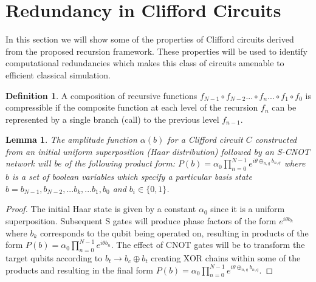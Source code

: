 \documentclass[reqno]{amsart}
\newtheorem{lem}[thm]{Lemma}
\theoremstyle{definition}
\newtheorem{definition}[thm]{Definition}
\theoremstyle{remark}
\begin{document}
\section{Redundancy in Clifford Circuits}
\noindent
In this section we will show some of the properties of Clifford circuits derived from the proposed recursion framework. These properties will be used to identify computational redundancies which makes this class of circuits amenable to efficient classical simulation.
\newline

\begin{definition}
A composition of recursive functions $f_{N-1} \circ f_{N-2} ... \circ f_n ... \circ f_1 \circ f_0$ is compressible if the composite function at each level of the recursion $f_n$ can be represented by a single branch (call) to the previous level $f_{n-1} $.

\end{definition}

\begin{lem}
The amplitude function $\alpha(b)$ for a Clifford circuit $C$ constructed from an initial uniform superposition (Haar distribution) followed by an S-CNOT network will be of the following product form: $P(b) = \alpha_0 \prod_{n=0}^{N-1} {e^{i \theta \oplus_{n,q} b_{n,q}} }$ where $b$ is a set of boolean variables which specify a particular basis state $b = b_{N-1}, b_{N-2},...b_k,...b_1, b_0$ and $b_i \in \{0,1\}$.
 \end{lem}


\begin{proof}
The initial Haar state is given by a constant $\alpha_0$ since it is a uniform superposition. Subsequent S gates will produce phase factors of the form $e^{i \theta b_k}$ where $b_k$ corresponds to the qubit being operated on, resulting in products of the form $P(b) = \alpha_0 \prod_{n=0}^{N-1}{ e^{i \theta b_n }  } $. The effect of CNOT gates will be to transform the target qubits according to $b_t \rightarrow b_c \oplus b_t$ creating XOR chains within some of the products and resulting in the final form  $P(b) = \alpha_0 \prod_{n=0}^{N-1} {e^{i \theta \oplus_{n,q} b_{n,q}} }$.
\end{proof}
\end{document}
